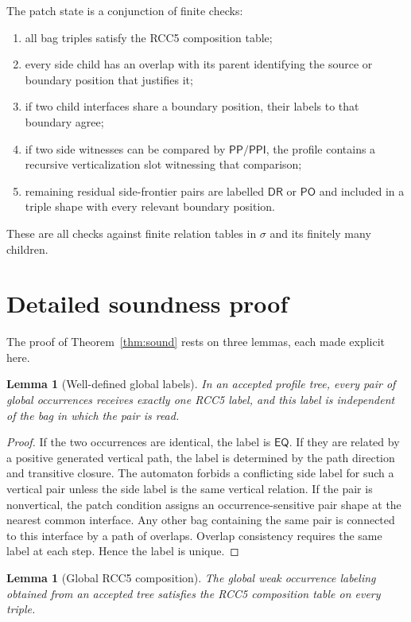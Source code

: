 \documentclass[11pt]{article}
\newtheorem{lemma}[theorem]{Lemma}
\newcommand{\EQ}{\mathsf{EQ}}
\newcommand{\PP}{\mathsf{PP}}
\newcommand{\PPI}{\mathsf{PPI}}
\newcommand{\PO}{\mathsf{PO}}
\newcommand{\DR}{\mathsf{DR}}
\begin{document}
The patch state is a conjunction of finite checks:
\begin{enumerate}[label=(Z\arabic*)]
\item all bag triples satisfy the RCC5 composition table;
\item every side child has an overlap with its parent identifying the source or boundary position that justifies it;
\item if two child interfaces share a boundary position, their labels to that boundary agree;
\item if two side witnesses can be compared by $\PP/\PPI$, the profile contains a recursive verticalization slot witnessing that comparison;
\item remaining residual side-frontier pairs are labelled $\DR$ or $\PO$ and included in a triple shape with every relevant boundary position.
\end{enumerate}
These are all checks against finite relation tables in $\sigma$ and its finitely many children.

\section{Detailed soundness proof}

The proof of Theorem~\ref{thm:sound} rests on three lemmas, each made explicit here.

\begin{lemma}[Well-defined global labels]
In an accepted profile tree, every pair of global occurrences receives exactly one RCC5 label, and this label is independent of the bag in which the pair is read.
\end{lemma}

\begin{proof}
If the two occurrences are identical, the label is $\EQ$.  If they are related by a positive generated vertical path, the label is determined by the path direction and transitive closure.  The automaton forbids a conflicting side label for such a vertical pair unless the side label is the same vertical relation.  If the pair is nonvertical, the patch condition assigns an occurrence-sensitive pair shape at the nearest common interface.  Any other bag containing the same pair is connected to this interface by a path of overlaps.  Overlap consistency requires the same label at each step.  Hence the label is unique.
\end{proof}

\begin{lemma}[Global RCC5 composition]
The global weak occurrence labeling obtained from an accepted tree satisfies the RCC5 composition table on every triple.
\end{lemma}
\end{document}

